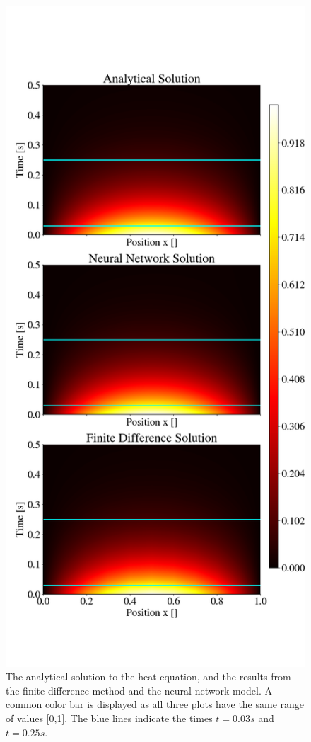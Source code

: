 
\begin{figure}[h!]
    \centering
    \includegraphics[width=1.0\linewidth]{project_3/plots/heat_map_comparison.png}
    \caption{The analytical solution to the heat equation, and the results from the finite difference method and the neural network model. A common color bar is displayed as all three plots have the same range of values [0,1]. The blue lines indicate the times $t = 0.03 s$ and $t = 0.25 s$.}
    \label{fig:heatmaps}
\end{figure}

